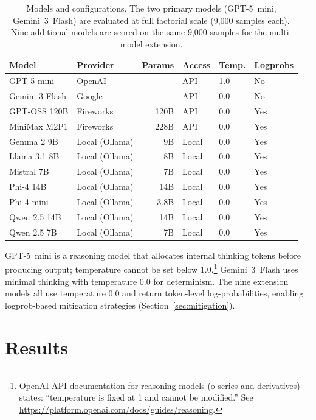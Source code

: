 \documentclass[11pt]{article}
\begin{document}
\begin{table}[t]
\centering
\caption{Models and configurations. The two primary models (GPT-5~mini, Gemini~3~Flash) are evaluated at full factorial scale (9{,}000 samples each). Nine additional models are scored on the same 9{,}000 samples for the multi-model extension.}
\label{tab:models}
\begin{tabular}{@{}llrlll@{}}
\toprule
\textbf{Model} & \textbf{Provider} & \textbf{Params} & \textbf{Access} & \textbf{Temp.} & \textbf{Logprobs} \\
\midrule
GPT-5 mini & OpenAI & --- & API & 1.0 & No \\
Gemini 3 Flash & Google & --- & API & 0.0 & No \\
\midrule
GPT-OSS 120B & Fireworks & 120B & API & 0.0 & Yes \\
MiniMax M2P1 & Fireworks & 228B & API & 0.0 & Yes \\
Gemma 2 9B & Local (Ollama) & 9B & Local & 0.0 & Yes \\
Llama 3.1 8B & Local (Ollama) & 8B & Local & 0.0 & Yes \\
Mistral 7B & Local (Ollama) & 7B & Local & 0.0 & Yes \\
Phi-4 14B & Local (Ollama) & 14B & Local & 0.0 & Yes \\
Phi-4 mini & Local (Ollama) & 3.8B & Local & 0.0 & Yes \\
Qwen 2.5 14B & Local (Ollama) & 14B & Local & 0.0 & Yes \\
Qwen 2.5 7B & Local (Ollama) & 7B & Local & 0.0 & Yes \\
\bottomrule
\end{tabular}
\end{table}

GPT-5~mini is a reasoning model that allocates internal thinking tokens before producing output; temperature cannot be set below 1.0.\footnote{OpenAI API documentation for reasoning models (o-series and derivatives) states: ``temperature is fixed at 1 and cannot be modified.'' See \url{https://platform.openai.com/docs/guides/reasoning}.} Gemini~3~Flash uses minimal thinking with temperature 0.0 for determinism. The nine extension models all use temperature 0.0 and return token-level log-probabilities, enabling logprob-based mitigation strategies (Section~\ref{sec:mitigation}).

\section{Results}
\label{sec:results}
\end{document}
